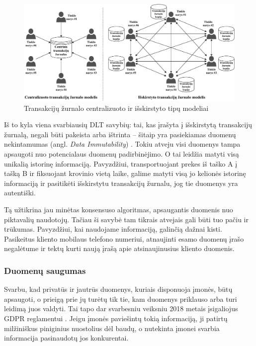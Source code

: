 \begin{figure}[H]
    \centering
    \includegraphics[scale=0.63]{images/ledger-model-types}
    \caption{Transakcijų žurnalo centralizuoto ir išskirstyto tipų modeliai}
\end{figure}

Iš to kyla viena svarbiausių DLT savybių: tai, kas įrašyta į išskirstytą transakcijų žurnalą, negali būti pakeista arba ištrinta – šitaip yra pasiekiamas duomenų nekintamumas (angl. \textit{Data Immutability}) \cite{xu2017dl}. Tokiu atveju visi duomenys tampa apsaugoti nuo potencialaus duomenų padirbinėjimo. O tai leidžia matyti visą unikalią istorinę informaciją. Pavyzdžiui, transportuojant prekes iš taško A į tašką B ir fiksuojant krovinio vietą laike, galime matyti visą jo kelionės istorinę informaciją ir pasitikėti išskirstytu transakcijų žurnalu, jog tie duomenys yra autentiški. 

Tą užtikrina jau minėtas konsensuso algoritmas, apsaugantis duomenis nuo piktavalių naudotojų. Tačiau ši savybė tam tikrais atvejais gali būti tuo pačiu ir trūkumas. Pavyzdžiui, kai naudojame informaciją, galinčią dažnai kisti. Pasikeitus kliento mobilaus telefono numeriui, atnaujinti esamo duomenų įrašo negalėtume ir tektų kurti naują įrašą apie atsinaujinusius kliento duomenis.




\subsubsection{Duomenų saugumas}

Svarbu, kad privatūs ir jautrūs duomenys, kuriais disponuoja įmonės, būtų apsaugoti, o prieigą prie jų turėtų tik tie, kam duomenys priklauso arba turi leidimą juos valdyti. Tai tapo dar svarbesniu veiksniu 2018 metais įsigaliojus GDPR reglamentui \cite{ferrari2018eu}. Jeigu įmonės paviešintų tokią informaciją, ji patirtų milžiniškus piniginius nuostolius dėl baudų, o nutekinta įmonei svarbia informacija pasinaudotų jos konkurentai.


